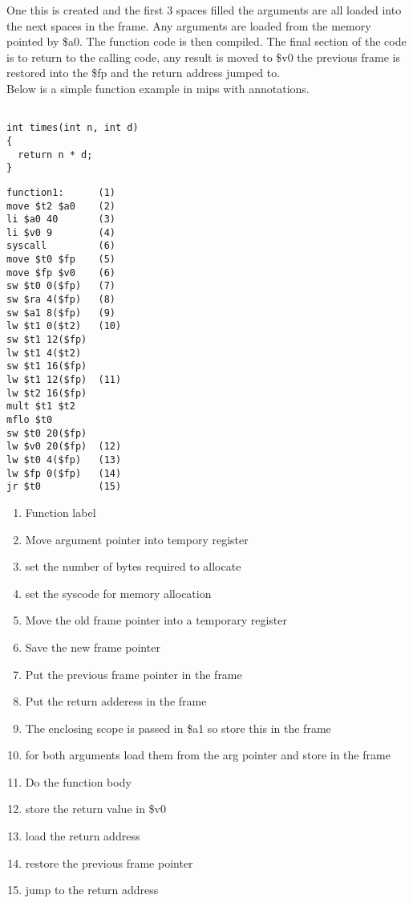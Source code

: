 \documentclass{article}
\begin{document}
One this is created and the first 3 spaces filled the arguments are all loaded
into the next spaces in the frame. Any arguments are loaded from the memory pointed
by \$a0. The function code is then compiled. The final
section of the code is to return to the calling code, any result is moved to \$v0
the previous frame is restored into the \$fp and the return address jumped to.\\
Below is a simple function example in mips with annotations.

\begin{minipage}{0.4\textwidth}
\begin{lstlisting}

int times(int n, int d)
{
  return n * d;
}

\end{lstlisting}
\end{minipage}%
\begin{minipage}{0.6\textwidth}
\begin{lstlisting}
function1:      (1)
move $t2 $a0    (2)
li $a0 40       (3)
li $v0 9        (4)
syscall         (6)
move $t0 $fp    (5)
move $fp $v0    (6)
sw $t0 0($fp)   (7)
sw $ra 4($fp)   (8)
sw $a1 8($fp)   (9)
lw $t1 0($t2)   (10)
sw $t1 12($fp)
lw $t1 4($t2)
sw $t1 16($fp)
lw $t1 12($fp)  (11)
lw $t2 16($fp)
mult $t1 $t2
mflo $t0
sw $t0 20($fp)
lw $v0 20($fp)  (12)
lw $t0 4($fp)   (13)
lw $fp 0($fp)   (14)
jr $t0          (15)
\end{lstlisting}
\end{minipage}%

\begin{enumerate}
\item Function label
\item Move argument pointer into tempory register
\item set the number of bytes required to allocate
\item set the syscode for memory allocation
\item Move the old frame pointer into a temporary register
\item Save the new frame pointer
\item Put the previous frame pointer in the frame
\item Put the return adderess in the frame
\item The enclosing scope is passed in \$a1 so store this in the frame
\item for both arguments load them from the arg pointer and store in the frame
\item Do the function body
\item store the return value in \$v0
\item load the return address
\item restore the previous frame pointer
\item jump to the return address
\end{enumerate}
\end{document}
